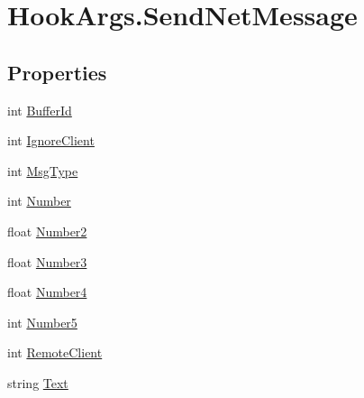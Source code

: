 \hypertarget{structOTA_1_1Plugin_1_1HookArgs_1_1SendNetMessage}{}\section{Hook\+Args.\+Send\+Net\+Message}
\label{structOTA_1_1Plugin_1_1HookArgs_1_1SendNetMessage}
\subsection*{Properties}
\begin{DoxyCompactItemize}
\item 
int \hyperlink{structOTA_1_1Plugin_1_1HookArgs_1_1SendNetMessage_a40875775d70fb4be60823b9834f4ea82}{Buffer\+Id}
\item 
int \hyperlink{structOTA_1_1Plugin_1_1HookArgs_1_1SendNetMessage_a18fff2568c9b3de0be4cfecd3e4463aa}{Ignore\+Client}
\item 
int \hyperlink{structOTA_1_1Plugin_1_1HookArgs_1_1SendNetMessage_aa3df23b99ffef4508cc26c819889e700}{Msg\+Type}
\item 
int \hyperlink{structOTA_1_1Plugin_1_1HookArgs_1_1SendNetMessage_acf5ae4f5ecc8e72593cf0f832377b945}{Number}
\item 
float \hyperlink{structOTA_1_1Plugin_1_1HookArgs_1_1SendNetMessage_a99d8e2d0a8e452cbb600cf97b083bb83}{Number2}
\item 
float \hyperlink{structOTA_1_1Plugin_1_1HookArgs_1_1SendNetMessage_ac43109cdc27c1988f42dcb0bd9c3e3c2}{Number3}
\item 
float \hyperlink{structOTA_1_1Plugin_1_1HookArgs_1_1SendNetMessage_a24a2631ffdf0a37ee1a908dee2ea44de}{Number4}
\item 
int \hyperlink{structOTA_1_1Plugin_1_1HookArgs_1_1SendNetMessage_a916f45fca66dc84a59310d2bc8177651}{Number5}
\item 
int \hyperlink{structOTA_1_1Plugin_1_1HookArgs_1_1SendNetMessage_a40759627b2a827508158b451d3b720e1}{Remote\+Client}
\item 
string \hyperlink{structOTA_1_1Plugin_1_1HookArgs_1_1SendNetMessage_ab4726c7c06ae41233e679361293b4173}{Text}
\end{DoxyCompactItemize}



